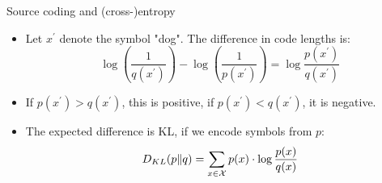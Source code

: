 \documentclass[11pt,compress,t,notes=noshow, xcolor=table]{beamer}
\begin{document}
\begin{vbframe} {Source coding and (cross-)entropy}
  \begin{itemize}
   \item Let $x^\prime$ denote the symbol "dog". The difference in code lengths is:
  $$ \log \left ( \frac{1}{q(x^\prime)} \right ) - \log \left( \frac{1}{p(x^\prime)} \right) = \log \frac{p(x^\prime)}{q(x^\prime)} $$
  
\item If $p(x^\prime) > q(x^\prime)$, this is positive, if $p(x^\prime) < q(x^\prime)$, it is negative. 
    \item The expected difference is KL, if we encode symbols from $p$:
  $$ D_{KL}(p \| q) = \sum_{x \in \mathcal{X}} p(x) \cdot \log \frac{p(x)}{q(x)} $$
  \end{itemize}

\end{vbframe}


\endlecture
\end{document}
